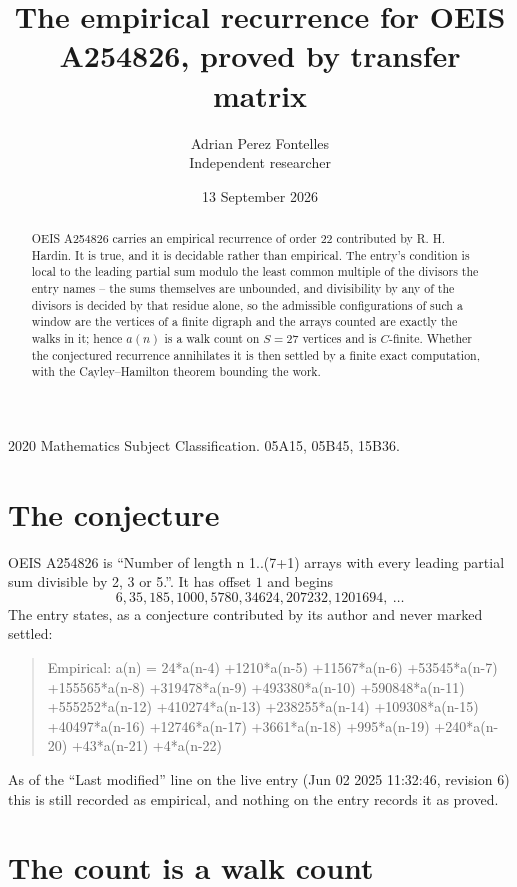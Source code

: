 \documentclass[11pt,a4paper]{article}
\title{The empirical recurrence for OEIS A254826, proved by transfer matrix}
\author{Adrian Perez Fontelles\\ \small Independent researcher}
\date{13 September 2026}
\theoremstyle{plain}
\theoremstyle{definition}
\begin{document}
\maketitle

\begin{abstract}
OEIS A254826 carries an empirical recurrence of order $22$ contributed by R. H. Hardin. It is
true, and it is decidable rather than empirical. The entry's condition is local to the leading partial sum modulo the least common multiple of the divisors the entry names -- the sums themselves are unbounded, and divisibility by any of the divisors is decided by that residue alone, so
the admissible configurations of such a window are the vertices of a finite digraph and the
arrays counted are exactly the walks in it; hence $a(n)$ is a walk count on $S=27$ vertices
and is $C$-finite. Whether the conjectured recurrence annihilates it is then settled by a
finite exact computation, with the Cayley--Hamilton theorem bounding the work.
\end{abstract}

\noindent\small 2020 Mathematics Subject Classification. 05A15, 05B45, 15B36.\normalsize

\section{The conjecture}

OEIS A254826 is ``Number of length n 1..(7+1) arrays with every leading partial sum divisible by 2, 3 or 5.''. It has offset $1$ and begins
\[
6, 35, 185, 1000, 5780, 34624, 207232, 1201694,\ \dots
\]
The entry states, as a conjecture contributed by its author and never marked settled:
\begin{quote}
Empirical: a(n) = 24*a(n-4) +1210*a(n-5) +11567*a(n-6) +53545*a(n-7) +155565*a(n-8) +319478*a(n-9) +493380*a(n-10) +590848*a(n-11) +555252*a(n-12) +410274*a(n-13) +238255*a(n-14) +109308*a(n-15) +40497*a(n-16) +12746*a(n-17) +3661*a(n-18) +995*a(n-19) +240*a(n-20) +43*a(n-21) +4*a(n-22)
\end{quote}
As of the ``Last modified'' line on the live entry (Jun 02 2025 11:32:46, revision 6) this is still
recorded as empirical, and nothing on the entry records it as proved.

\section{The count is a walk count}
\end{document}
